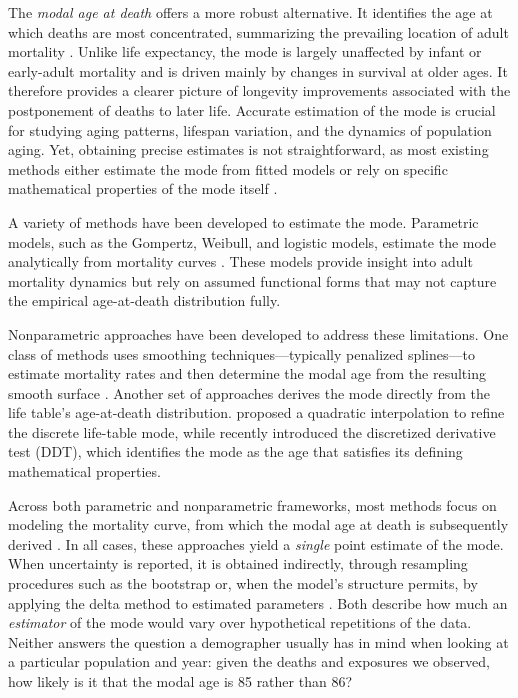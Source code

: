 \documentclass[12pt, letterpaper]{article}
\begin{document}
The \emph{modal age at death} offers a more robust alternative. It identifies the age at which deaths are most concentrated, summarizing the prevailing location of adult mortality \citep{bergeron2015decomposing, canudas2008modal}. Unlike life expectancy, the mode is largely unaffected by infant or early-adult mortality and is driven mainly by changes in survival at older ages. It therefore provides a clearer picture of longevity improvements associated with the postponement of deaths to later life. Accurate estimation of the mode is crucial for studying aging patterns, lifespan variation, and the dynamics of population aging. Yet, obtaining precise estimates is not straightforward, as most existing methods either estimate the mode from fitted models or rely on specific mathematical properties of the mode itself \citep{kannisto2001mode, horiuchi2013modal, vazquez2024longevity}.

A variety of methods have been developed to estimate the mode. Parametric models, such as the Gompertz, Weibull, and logistic models, estimate the mode analytically from mortality curves \citep{kannisto2001mode, missov2015gompertz}. These models provide insight into adult mortality dynamics but rely on assumed functional forms that may not capture the empirical age-at-death distribution fully.

Nonparametric approaches have been developed to address these limitations. One class of methods uses smoothing techniques—typically penalized splines—to estimate mortality rates and then determine the modal age from the resulting smooth surface \citep{ouellette2011changes}. Another set of approaches derives the mode directly from the life table’s age-at-death distribution. \citet{kannisto2001mode} proposed a quadratic interpolation to refine the discrete life-table mode, while \citet{vazquez2024longevity} recently introduced the discretized derivative test (DDT), which identifies the mode as the age that satisfies its defining mathematical properties. 

Across both parametric and nonparametric frameworks, most methods focus on modeling the mortality curve, from which the modal age at death is subsequently derived \citep[see, e.g.,][]{booth2008mortality}. In all cases, these approaches yield a \emph{single} point estimate of the mode. When uncertainty is reported, it is obtained indirectly, through resampling procedures such as the bootstrap or, when the model's structure permits, by applying the delta method to estimated parameters \citep{andreev2010spreadsheet, keyfitz2005applied}. Both describe how much an \emph{estimator} of the mode would vary over hypothetical repetitions of the data. Neither answers the question a demographer usually has in mind when looking at a particular population and year: given the deaths and exposures we observed, how likely is it that the modal age is 85 rather than 86?
\end{document}
